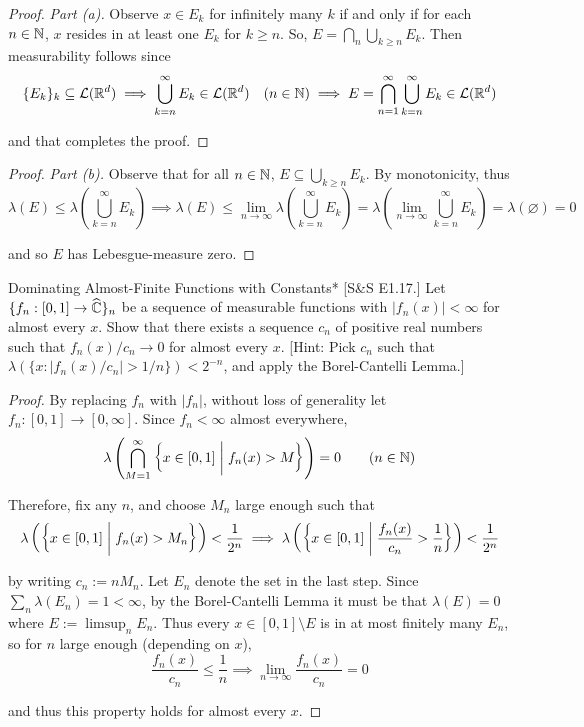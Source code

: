 \begin{proof}
    \textit{Part (a).} Observe $x \in E_k$ for infinitely many $k$ if and only if for each $n \in \mathbb{N}$, $x$ resides in at least one $E_k$ for $k \geq n$. So, $E = \bigcap_n \bigcup_{k \geq n} E_k$. Then measurability follows since 
    $$
    \{E_k\}_k \subseteq \mathcal{L}(\mathbb{R}^d)
    \implies \bigcup_{k = n}^\infty E_k \in \mathcal{L}(\mathbb{R}^d) \quad (n \in \mathbb{N})
    \implies E = \bigcap_{n=1}^\infty \bigcup_{k = n}^\infty E_k \in \mathcal{L}(\mathbb{R}^d)
    $$

    and that completes the proof.
\end{proof}

\begin{proof}
    \textit{Part (b).} Observe that for all $n \in \mathbb{N}$, $E \subseteq \bigcup_{k \geq n} E_k$. By monotonicity, thus 
    $$
    \lambda(E) 
    \leq \lambda \left( \bigcup_{k = n}^\infty E_k \right)
    \implies 
    \lambda(E) 
    \leq \lim_{n \to \infty} \lambda\left(\bigcup_{k = n}^\infty E_k \right) 
    = \lambda\left(\lim_{n \to \infty} \bigcup_{k = n}^\infty E_k \right) 
    = \lambda(\varnothing) 
    = 0
    $$

    and so $E$ has Lebesgue-measure zero. 
\end{proof}

\begin{problem}{Dominating Almost-Finite Functions with Constants}*
    [S\&S E1.17.] Let $\{f_n : [0, 1] \to \widehat{\mathbb{C}}\}_n$ be a sequence of measurable functions with $|f_n(x)|<\infty$ for almost every $x$. Show that there exists a sequence $c_n$ of positive real numbers such that $f_n(x) / c_n \to 0$ for almost every $x$. [Hint: Pick $c_n$ such that $\lambda(\{x : |f_n(x) / c_n| > 1/n\}) < 2^{-n}$, and apply the Borel-Cantelli Lemma.]
\end{problem}

\begin{proof}
    By replacing $f_n$ with $|f_n|$, without loss of generality let $f_n : [0,1] \to [0, \infty]$. Since $f_n < \infty$ almost everywhere, 
    $$
    \lambda \left( \bigcap_{M = 1}^\infty \left\{ x \in [0, 1] \;\biggr\rvert\; f_n(x) > M \right\} \right) = 0
    \qquad (n \in \mathbb{N})
    $$

    Therefore, fix any $n$, and choose $M_n$ large enough such that 
    $$
    \lambda \left( \left\{ x \in [0, 1] \;\biggr\rvert\; f_n(x) > M_n \right\} \right) < \frac{1}{2^n}
    \implies 
    \lambda \left( \left\{ x \in [0, 1] \;\biggr\rvert\; \frac{f_n(x)}{c_n} > \frac{1}{n} \right\} \right) < \frac{1}{2^n}
    $$

    by writing $c_n := nM_n$. Let $E_n$ denote the set in the last step. Since $\sum_{n} \lambda(E_n) = 1 < \infty$, by the Borel-Cantelli Lemma it must be that $\lambda(E) = 0$ where $E := \limsup_n E_n$. Thus every $x \in [0, 1] \setminus E$ is in at most finitely many $E_n$, so for $n$ large enough (depending on $x$), 
    $$
    \frac{f_n(x)}{c_n} \leq \frac{1}{n} \implies \lim_{n \to \infty} \frac{f_n(x)}{c_n} = 0
    $$

    and thus this property holds for almost every $x$. 
\end{proof}

